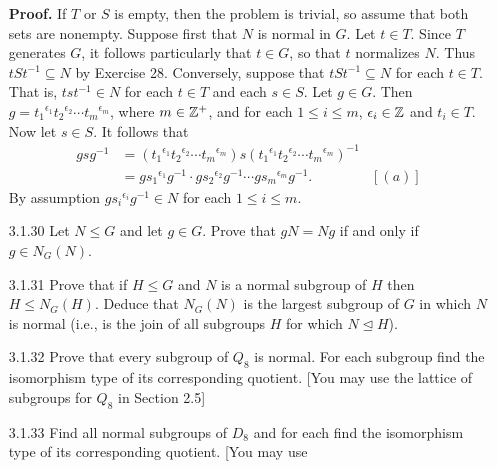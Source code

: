 \begin{enumerate}
      \textbf{Proof.} If $T$ or $S$ is empty, then the problem is trivial, so
      assume that both sets are nonempty. Suppose first that $N$ is normal in
      $G$. Let $t \in T$. Since $T$ generates $G$, it follows particularly that
      $t \in G$, so that $t$ normalizes $N$. Thus $tSt^{-1} \subseteq N$ by
      Exercise 28. Conversely, suppose that $tSt^{-1} \subseteq N$ for each
      $t \in T$. That is, $tst^{-1} \in N$ for each $t \in T$ and each
      $s \in S$. Let $g \in G$. Then
      $g = {t_1}^{\epsilon_1}{t_2}^{\epsilon_2} \cdots
       {t_m}^{\epsilon_m}$, where $m \in \mathbb{Z}^+$, and for each $1 \le i \le m$,
      $\epsilon_i \in \mathbb{Z}$ and $t_i \in T$. Now let $s \in S$. It follows that
      \begin{align*}
         gsg^{-1} &= ({t_1}^{\epsilon_1}{t_2}^{\epsilon_2} \cdots
                     {t_m}^{\epsilon_m})s({t_1}^{\epsilon_1}{t_2}^{\epsilon_2} 
                  \cdots{t_m}^{\epsilon_m})^{-1} \\
                     &= g{s_1}^{\epsilon_1}g^{-1}\cdot g{s_2}^{\epsilon_2}g^{-1} 
                        \cdots g{s_m}^{\epsilon_m}g^{-1}. &[(a)]
               \end{align*}
               By assumption $g{s_i}^{\epsilon_i}g^{-1} \in N$ for each
               $1 \le i \le m$.
   \item[3.1.30]  Let $N \le G$ and let $g \in G$. Prove that $gN = Ng$ if and
                  only if $g \in N_G(N)$.
   \item[3.1.31]  Prove that if $H \le G$ and $N$ is a normal subgroup of $H$
                  then $H \le N_G(H)$. Deduce that $N_G(N)$ is the largest
                  subgroup of $G$ in which $N$ is normal (i.e., is the join of
                  all subgroups $H$ for which $N \trianglelefteq H$).
   \item[3.1.32]  Prove that every subgroup of $Q_8$ is normal. For each
                  subgroup find the isomorphism type of its corresponding
                  quotient. [You may use the lattice of subgroups for $Q_8$ in
                  Section 2.5]
   \item[3.1.33]  Find all normal subgroups of $D_8$ and for each find the
                  isomorphism type of its corresponding quotient. [You may use

\end{enumerate}
